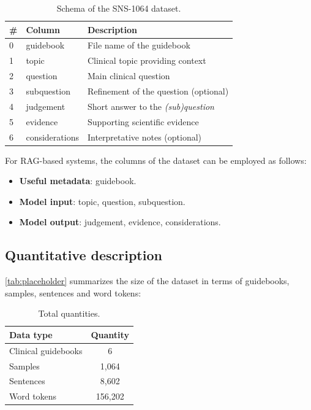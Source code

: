 \documentclass[11pt,a4paper]{article}
\begin{document}
\begin{table}[H]
\centering
\small
\begin{tabular}{lll}
\toprule
\textbf{\#} & \textbf{Column} & \textbf{Description} \\
\midrule
0 & guidebook & File name of the guidebook \\
1 & topic & Clinical topic providing context \\
2 & question & Main clinical question \\
3 & subquestion & Refinement of the question (optional) \\
4 & judgement & Short answer to the \textit{(sub)question} \\
5 & evidence & Supporting scientific evidence \\
6 & considerations & Interpretative notes (optional) \\
\bottomrule
\end{tabular}
\caption{Schema of the SNS-1064 dataset.}
\label{tab:schema}
\end{table}
\vspace{0.7cm}


\clearpage

For RAG-based systems, the columns of the dataset can be employed as follows:

\begin{itemize}
\item \textbf{Useful metadata}: guidebook.
\item \textbf{Model input}: topic, question, subquestion.
\item \textbf{Model output}: judgement, evidence, considerations.
\end{itemize}

\subsection{Quantitative description}

\autoref{tab:placeholder} summarizes the size of the dataset in terms of guidebooks, samples, sentences and word tokens:

\begin{table}[H]
    \centering
    \begin{tabular}{lc}
\toprule
\textbf{Data type} & \textbf{Quantity} \\
\midrule      
Clinical guidebooks & 6 \\
Samples & 1,064 \\
Sentences & 8,602 \\
Word tokens & 156,202 \\
\bottomrule
\end{tabular}
    \caption{Total quantities.}
    \label{tab:placeholder}
\end{table}
\end{document}
